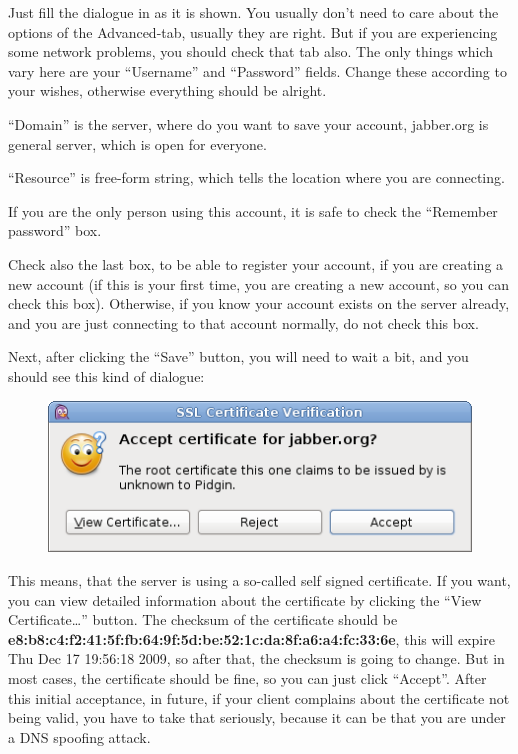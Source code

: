 Just f\hbox{}ill the dialogue in as it is shown. You usually don't need to care
about the options of the Advanced-tab, usually they are right. But if you are
experiencing some network problems, you should check that tab also. The only
things which vary here are your ``Username'' and ``Password'' f\hbox{}ields.
Change these according to your wishes, otherwise everything should be alright. 

``Domain'' is the server, where do you want to save your account, jabber.org is
general server, which is open for everyone.

``Resource'' is free-form string, which tells the location where you are
connecting.

If you are the only person using this account, it is safe to check the
``Remember password'' box.

Check also the last box, to be able to register your account, if you are
creating a new account (if this is your f\hbox{}irst time, you are creating a
new account, so you can check this box). Otherwise, if you know your account
exists on the server already, and you are just connecting to that account
normally, do not check this box.

Next, after clicking the ``Save'' button, you will need to wait a bit, and you
should see this kind of dialogue:

\begin{figure}
    \includegraphics[scale=0.40]{./media/jabber_pidgin_ssl_certificate_verification}
\end{figure}

This means, that the server is using a so-called self signed certif\hbox{}icate.
If you want, you can view detailed information about the certif\hbox{}icate by
clicking the ``View Certif\hbox{}icate\ldots'' button. The checksum of the
certif\hbox{}icate should be
\textbf{e8:b8:c4:f2:41:5f:fb:64:9f:5d:be:52:1c:da:8f:a6:a4:fc:33:6e}, this will
expire Thu Dec 17 19:56:18 2009, so after that, the checksum is going to change.
But in most cases, the certif\hbox{}icate should be f\hbox{}ine, so you can just
click “Accept”.  After this initial acceptance, in future, if your client
complains about the certif\hbox{}icate not being valid, you have to take that
seriously, because it can be that you are under a DNS spoof\hbox{}ing attack.

